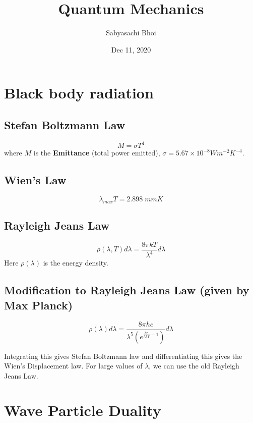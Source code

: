 \documentclass[12pt]{extarticle}
\begin{document}
\title{Quantum Mechanics}
\author{Sabyasachi Bhoi}
\date{Dec 11, 2020}
\maketitle

\section{Black body radiation}
\subsection{Stefan Boltzmann Law}
\begin{equation}
	M = \sigma T^4
\end{equation}
where $M$ is the \textbf{Emittance} (total power emitted), $\sigma = 5.67\times 10^{-8} Wm^{-2}K^{-4}$.

\subsection{Wien's Law}
\begin{equation}
	\lambda_{max} T = 2.898\;mm K
\end{equation}

\subsection{Rayleigh Jeans Law}
\begin{equation}
	\rho(\lambda, T)d\lambda = \frac{8\pi k T}{\lambda^4} d\lambda 
\end{equation}
Here $\rho(\lambda)$ is the energy density.

\subsection{Modification to Rayleigh Jeans Law (given by Max Planck)}
\begin{equation}
	\rho(\lambda) d\lambda = \frac{8 \pi h c}{\lambda^5 (e^{ \frac{hc}{\lambda kT} - 1})} d\lambda
\end{equation}

Integrating this gives Stefan Boltzmann law and differentiating this gives the Wien's Displacement law. For large values of $\lambda$, we can use the old Rayleigh Jeans Law.

\section{Wave Particle Duality}
\end{document}
